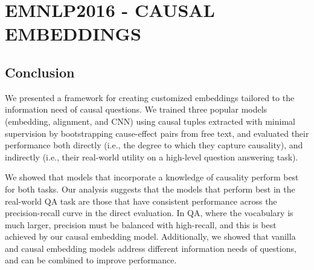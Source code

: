 
\chapter{EMNLP2016 - CAUSAL EMBEDDINGS\label{chapter:emnlp2016}}



%
%







\section{Conclusion}
We presented a framework for creating customized embeddings tailored to the information need of causal questions.  We trained three popular models (embedding, alignment, and CNN) using causal tuples extracted with minimal supervision by bootstrapping cause-effect pairs from free text, and evaluated their performance both directly (i.e., the degree to which they capture causality), and indirectly (i.e., their real-world utility on a high-level question answering task). 


We showed that models that incorporate a knowledge of causality perform best for both tasks. 
Our analysis suggests that the models that perform best in the real-world QA task are those that have consistent performance across the precision-recall curve in the direct evaluation.
In QA, where the vocabulary is much larger, precision must be balanced with high-recall, and this is best achieved by our causal embedding model.  Additionally, we showed that vanilla and causal embedding models address different information needs of questions, and can be combined to improve performance. 

